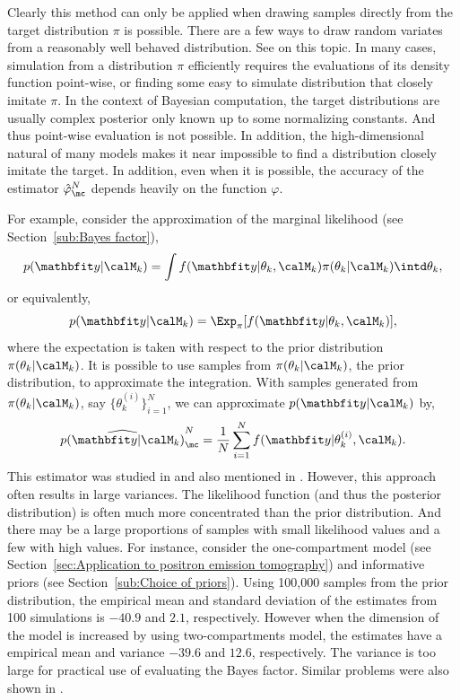 Clearly this method can only be applied when drawing samples directly from the
target distribution $\pi$ is possible. There are a few ways to draw random
variates from a reasonably well behaved distribution. See
\cite[][chap.~2]{Robert:2004tn} on this topic. In many cases, simulation from
a distribution $\pi$ efficiently requires the evaluations of its density
function point-wise, or finding some easy to simulate distribution that
closely imitate $\pi$. In the context of Bayesian computation, the target
distributions are usually complex posterior only known up to some normalizing
constants. And thus point-wise evaluation is not possible. In addition, the
high-dimensional natural of many models makes it near impossible to find a
distribution closely imitate the target. In addition, even when it is
possible, the accuracy of the estimator $\hat\varphi_{\mc}^N$ depends heavily
on the function $\varphi$.

For example, consider the approximation of the marginal likelihood (see
Section~\ref{sub:Bayes factor}),
\begin{equation*}
  p(\data|\calM_k) =
  \int f(\data|\theta_k,\calM_k)\pi(\theta_k|\calM_k) \intd \theta_k,
\end{equation*}
or equivalently,
\begin{equation}
  p(\data|\calM_k) = \Exp_{\pi}[f(\data|\theta_k,\calM_k)],
  \label{eq:prior expectation}
\end{equation}
where the expectation is taken with respect to the prior distribution
$\pi(\theta_k|\calM_k)$. It is possible to use samples from
$\pi(\theta_k|\calM_k)$, the prior distribution, to approximate the
integration. With samples generated from $\pi(\theta_k|\calM_k)$, say
$\{\theta_k^{(i)}\}_{i=1}^N$, we can approximate $p(\data|\calM_k)$ by,
\begin{equation}
  \widehat{p(\data|\calM_k)}_{\mc}^N
  = \frac{1}{N}\sum_{i=1}^N f(\data|\theta_k^{(i)},\calM_k).
\end{equation}
This estimator was studied in \cite{McCulloch:1991vx} and also mentioned in
\cite{Kass:1995vb}. However, this approach often results in large variances.
The likelihood function (and thus the posterior distribution) is often much
more concentrated than the prior distribution. And there may be a large
proportions of samples with small likelihood values and a few with high
values. For instance, consider the one-compartment \pet model (see
Section~\ref{sec:Application to positron emission tomography}) and
informative priors (see Section~\ref{sub:Choice of priors}). Using 100,000
samples from the prior distribution, the empirical mean and standard deviation
of the estimates from 100 simulations is $-40.9$ and $2.1$, respectively.
However when the dimension of the model is increased by using two-compartments
model, the estimates have a empirical mean and variance $-39.6$ and $12.6$,
respectively. The variance is too large for practical use of evaluating the
Bayes factor. Similar problems were also shown in \cite{McCulloch:1991vx}.

